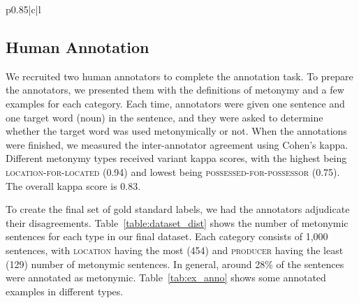 \documentclass[11pt]{article}
\newcommand{\cmark}{\ding{51}}%
\newcommand{\xmark}{\ding{55}}%
\newcommand{\tr}[1]{\textcolor{red}{#1}}
\newcommand{\tg}[1]{\textcolor{darkgreen}{#1}}
\newcommand{\tb}[1]{\textcolor{blue}{#1}}
\begin{document}
\begin{table*}[t]
{\begin{NiceTabular}{p{0.85\linewidth}|c|l}
    \end{NiceTabular}
    }
    \caption{A sample of the annotated examples. The target words are marked in \textbf{\tb{blue}}. The second column shows the annotated label for metonymy (\tg{\cmark}) vs. non-metonymy (\tr{\xmark}). If yes, the third column shows the metonymy type.}
    \label{tab:ex_anno}
\end{table*}
\endgroup

\subsection{Human Annotation}
We recruited two human annotators to complete the annotation task. To prepare the annotators, we presented them with the definitions of metonymy and a few examples for each category. Each time, annotators were given one sentence and one target word (noun) in the sentence, and they were asked to determine whether the target word was used metonymically or not. When the annotations were finished, we measured the inter-annotator agreement using Cohen's kappa. Different metonymy types received variant kappa scores, with the highest being \textsc{location-for-located} (0.94) and lowest being \textsc{possessed-for-possessor} (0.75). The overall kappa score is 0.83.

To create the final set of gold standard labels, we had the annotators adjudicate their disagreements. Table~\ref{table:dataset_dist} shows the number of metonymic sentences for each type in our final dataset. Each category consists of 1,000 sentences, with \textsc{location} having the most (454) and \textsc{producer} having the least (129) number of metonymic sentences. In general, around 28\% of the sentences were annotated as metonymic. Table~\ref{tab:ex_anno} shows some annotated examples in different types.

\begingroup

\begin{table}[t]
   \centering
\caption{Distribution of metonymic and non-metonymic examples across six categories. Each category contains 1,000 sentences (6,000 annotated sentences in total). }
\label{table:dataset_dist}
\end{table}
\endgroup
\end{document}
